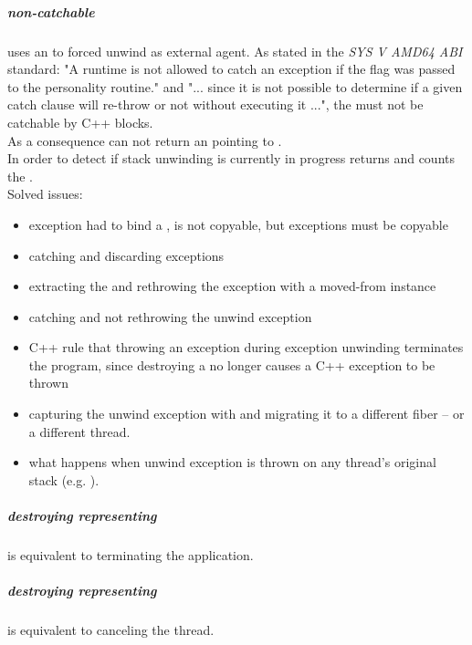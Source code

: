 \subparagraph{non-catchable \foreignex}
\unwindfib uses an \foreignex to forced unwind as external agent.
As stated in the \emph{SYS V AMD64 ABI}\cite{SYSVAMD64} standard:
"A runtime is not allowed to catch an exception if the  flag was passed to the personality routine."
and "... since it is not possible to determine if a given catch clause will re-throw or not without executing it ...", the
\foreignex must not be catchable by C++  blocks.\\
As a consequence \curex can not return an  pointing to \foreignex.\\
In order to detect if stack unwinding is currently in progress \uncex returns  and
\uncexs counts the \foreignex.\\

Solved issues:
\begin{itemize}
    \item exception had to bind a \fiber, \fiber is not copyable, but exceptions must be copyable
    \item catching and discarding exceptions
    \item extracting the \fiber and rethrowing the exception with a moved-from \fiber instance
    \item catching and not rethrowing the unwind exception
    \item C++ rule that throwing an exception during exception unwinding terminates the program, since destroying a \fiber no longer causes a C++ exception to be thrown
    \item capturing the unwind exception with  and migrating it to a different fiber -- or a different thread.
    \item what happens when unwind exception is thrown on any thread's original stack (e.g. ).
\end{itemize}

\subparagraph{destroying \fiber representing } is equivalent to terminating the application.

\subparagraph{destroying \fiber representing } is equivalent to canceling the thread.


